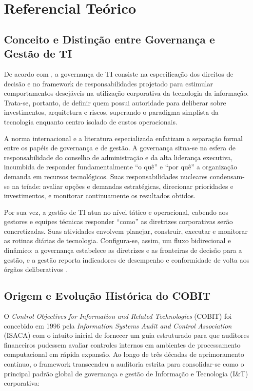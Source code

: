 \section{Referencial Teórico}

\subsection{Conceito e Distinção entre Governança e Gestão de TI}

De acordo com , a governança de TI consiste na especificação dos direitos de decisão e no framework de responsabilidades projetado para estimular comportamentos desejáveis na utilização corporativa da tecnologia da informação. Trata-se, portanto, de definir quem possui autoridade para deliberar sobre investimentos, arquitetura e riscos, superando o paradigma simplista da tecnologia enquanto centro isolado de custos operacionais.

A norma internacional  e a literatura especializada \cite{fernandes2014implantando} enfatizam a separação formal entre os papéis de governança e de gestão. A governança situa-se na esfera de responsabilidade do conselho de administração e da alta liderança executiva, incumbida de responder fundamentalmente ``o quê'' e ``por quê'' a organização demanda em recursos tecnológicos. Suas responsabilidades nucleares condensam-se na tríade: avaliar opções e demandas estratégicas, direcionar prioridades e investimentos, e monitorar continuamente os resultados obtidos.

Por sua vez, a gestão de TI atua no nível tático e operacional, cabendo aos gestores e equipes técnicas responder ``como'' as diretrizes corporativas serão concretizadas. Suas atividades envolvem planejar, construir, executar e monitorar as rotinas diárias de tecnologia. Configura-se, assim, um fluxo bidirecional e dinâmico: a governança estabelece as diretrizes e as fronteiras de decisão para a gestão, e a gestão reporta indicadores de desempenho e conformidade de volta aos órgãos deliberativos \cite{weill2004governance,isaca2019framework}.

\subsection{Origem e Evolução Histórica do COBIT}

O \textit{Control Objectives for Information and Related Technologies} (COBIT) foi concebido em 1996 pela \textit{Information Systems Audit and Control Association} (ISACA) com o intuito inicial de fornecer um guia estruturado para que auditores financeiros pudessem avaliar controles internos em ambientes de processamento computacional em rápida expansão. Ao longo de três décadas de aprimoramento contínuo, o framework transcendeu a auditoria estrita para consolidar-se como o principal padrão global de governança e gestão de Informação e Tecnologia (I\&T) corporativa:

